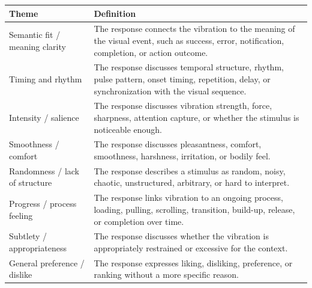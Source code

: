 \begin{appendixtable}
\centering
\small
\caption{Qualitative coding themes.}
\label{tab:qualitative-codebook}
\begin{singlespace}
\renewcommand{\arraystretch}{1.08}
\begin{tabular}{@{}>{\raggedright\arraybackslash}p{1.55in}>{\raggedright\arraybackslash}p{4.25in}@{}}
\hline
\textbf{Theme} & \textbf{Definition} \\
\hline
Semantic fit / meaning clarity & The response connects the vibration to the meaning of the visual event, such as success, error, notification, completion, or action outcome. \\
Timing and rhythm & The response discusses temporal structure, rhythm, pulse pattern, onset timing, repetition, delay, or synchronization with the visual sequence. \\
Intensity / salience & The response discusses vibration strength, force, sharpness, attention capture, or whether the stimulus is noticeable enough. \\
Smoothness / comfort & The response discusses pleasantness, comfort, smoothness, harshness, irritation, or bodily feel. \\
Randomness / lack of structure & The response describes a stimulus as random, noisy, chaotic, unstructured, arbitrary, or hard to interpret. \\
Progress / process feeling & The response links vibration to an ongoing process, loading, pulling, scrolling, transition, build-up, release, or completion over time. \\
Subtlety / appropriateness & The response discusses whether the vibration is appropriately restrained or excessive for the context. \\
General preference / dislike & The response expresses liking, disliking, preference, or ranking without a more specific reason. \\
\hline
\end{tabular}
\end{singlespace}
\end{appendixtable}
